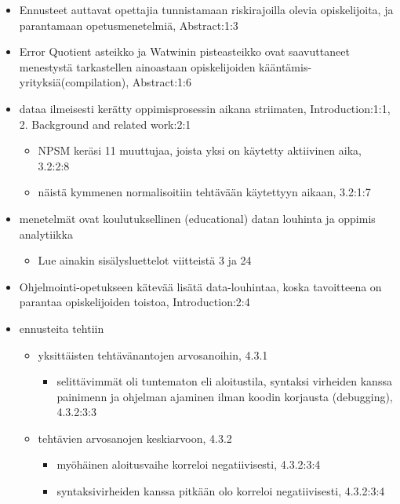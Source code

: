 \begin{itemize}
    \item Ennusteet auttavat opettajia tunnistamaan riskirajoilla olevia opiskelijoita, ja parantamaan opetusmenetelmiä\cite{carter2015normalized}, Abstract:1:3
    \item Error Quotient asteikko\cite{jadud2006methods} ja Watwinin pisteasteikko\cite{watson2014no} ovat saavuttaneet menestystä tarkastellen ainoastaan opiskelijoiden kääntämis-yrityksiä(compilation), Abstract:1:6
    \item dataa ilmeisesti kerätty oppimisprosessin aikana striimaten\cite{carter2015normalized}, Introduction:1:1, 2. Background and related work:2:1
        \begin{itemize}
            \item NPSM keräsi 11 muuttujaa, joista yksi on käytetty aktiivinen aika, 3.2:2:8
            \item näistä kymmenen normalisoitiin tehtävään käytettyyn aikaan, 3.2:1:7
        \end{itemize}
    \item menetelmät ovat koulutuksellinen (educational) datan louhinta ja oppimis analytiikka
    \begin{itemize}
        \item Lue ainakin sisälysluettelot viitteistä 3 ja 24
    \end{itemize}
    \item Ohjelmointi-opetukseen kätevää lisätä data-louhintaa, koska tavoitteena on parantaa opiskelijoiden toistoa, Introduction:2:4
    \item ennusteita tehtiin
    \begin{itemize}
        \item yksittäisten tehtävänantojen arvosanoihin, 4.3.1
        \begin{itemize}
            \item selittävimmät oli tuntematon eli aloitustila, syntaksi virheiden kanssa painimenn ja ohjelman ajaminen ilman koodin korjausta (debugging), 4.3.2:3:3
        \end{itemize}
        \item tehtävien arvosanojen keskiarvoon, 4.3.2
        \begin{itemize}
            \item myöhäinen aloitusvaihe korreloi negatiivisesti, 4.3.2:3:4
            \item syntaksivirheiden kanssa pitkään olo korreloi negatiivisesti, 4.3.2:3:4
        \end{itemize}

\end{itemize}
\end{itemize}
